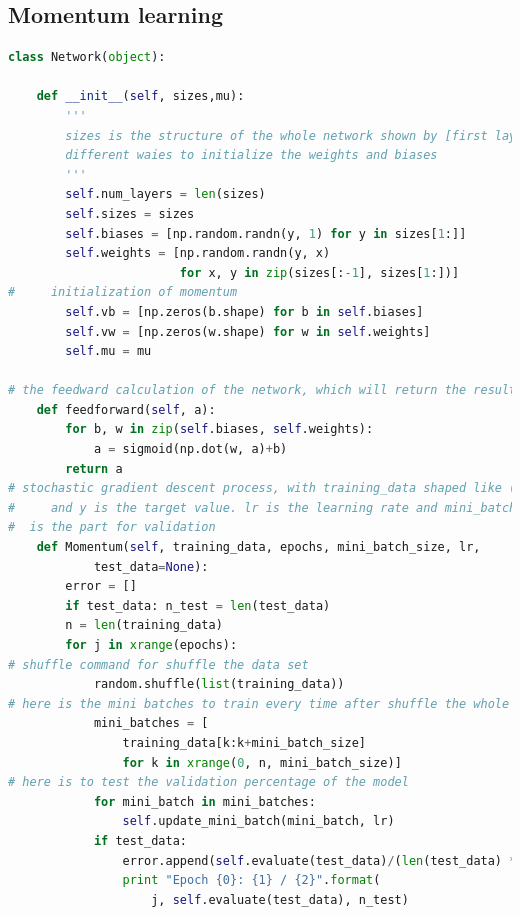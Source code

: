 \documentclass[12pt,a4paper]{article}
\begin{document}
\subsection{Momentum learning}
\begin{lstlisting}[language=Python]
class Network(object):

    def __init__(self, sizes,mu):
        '''
        sizes is the structure of the whole network shown by [first layer, second layer, ... , last year] as a list
        different waies to initialize the weights and biases
        '''
        self.num_layers = len(sizes)
        self.sizes = sizes
        self.biases = [np.random.randn(y, 1) for y in sizes[1:]]
        self.weights = [np.random.randn(y, x)
                        for x, y in zip(sizes[:-1], sizes[1:])]
#     initialization of momentum
        self.vb = [np.zeros(b.shape) for b in self.biases]
        self.vw = [np.zeros(w.shape) for w in self.weights]
        self.mu = mu

# the feedward calculation of the network, which will return the result to the last layer
    def feedforward(self, a):
        for b, w in zip(self.biases, self.weights):
            a = sigmoid(np.dot(w, a)+b)
        return a
# stochastic gradient descent process, with training_data shaped like (x,y), x is the traing data,
#     and y is the target value. lr is the learning rate and mini_batch_size is mini batch size. test_data
#  is the part for validation
    def Momentum(self, training_data, epochs, mini_batch_size, lr,
            test_data=None):
        error = []
        if test_data: n_test = len(test_data)
        n = len(training_data)
        for j in xrange(epochs):
# shuffle command for shuffle the data set
            random.shuffle(list(training_data))
# here is the mini batches to train every time after shuffle the whole training set
            mini_batches = [
                training_data[k:k+mini_batch_size]
                for k in xrange(0, n, mini_batch_size)]
# here is to test the validation percentage of the model
            for mini_batch in mini_batches:
                self.update_mini_batch(mini_batch, lr)
            if test_data:
                error.append(self.evaluate(test_data)/(len(test_data) * 1.0))
                print "Epoch {0}: {1} / {2}".format(
                    j, self.evaluate(test_data), n_test)
                

\end{lstlisting}
\end{document}
